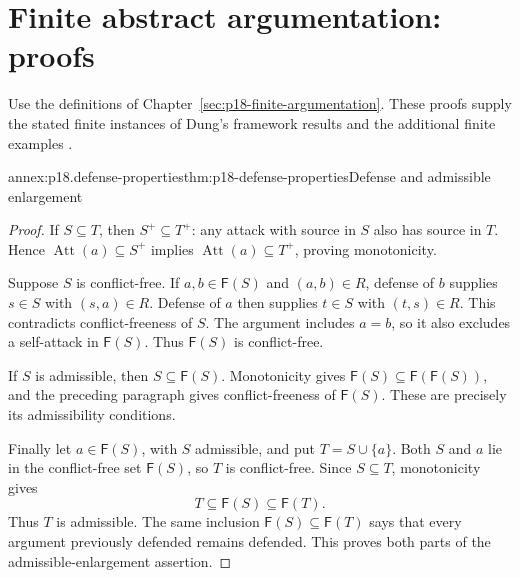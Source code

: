 \section{Finite abstract argumentation: proofs}
\label{sec:annex-p18-finite-argumentation}

Use the definitions of Chapter~\ref{sec:p18-finite-argumentation}. These proofs
supply the stated finite instances of Dung's framework results and the
additional finite examples \cite[pp.~326--330]{Dung1995}.

\begin{annexitem}{annex:p18.defense-properties}{thm:p18-defense-properties}{Defense and admissible enlargement}
\begin{proof}
If \(S\subseteq T\), then \(S^+\subseteq T^+\): any attack with
source in \(S\) also has source in \(T\). Hence
\(\operatorname{Att}(a)\subseteq S^+\) implies
\(\operatorname{Att}(a)\subseteq T^+\), proving monotonicity.

Suppose \(S\) is conflict-free. If \(a,b\in\mathsf F(S)\) and
\((a,b)\in R\), defense of \(b\) supplies \(s\in S\) with
\((s,a)\in R\). Defense of \(a\) then supplies \(t\in S\) with
\((t,s)\in R\). This contradicts conflict-freeness of \(S\).
The argument includes \(a=b\), so it also excludes a self-attack in
\(\mathsf F(S)\). Thus \(\mathsf F(S)\) is conflict-free.

If \(S\) is admissible, then \(S\subseteq\mathsf F(S)\).
Monotonicity gives \(\mathsf F(S)\subseteq\mathsf F(\mathsf F(S))\),
and the preceding paragraph gives conflict-freeness of \(\mathsf F(S)\).
These are precisely its admissibility conditions.

Finally let \(a\in\mathsf F(S)\), with \(S\) admissible, and put
\(T=S\cup\{a\}\). Both \(S\) and \(a\) lie in the conflict-free
set \(\mathsf F(S)\), so \(T\) is conflict-free. Since
\(S\subseteq T\), monotonicity gives
\[
 T\subseteq\mathsf F(S)\subseteq\mathsf F(T).
\]
Thus \(T\) is admissible. The same inclusion
\(\mathsf F(S)\subseteq\mathsf F(T)\) says that every argument
previously defended remains defended. This proves both parts of the
admissible-enlargement assertion.
\end{proof}
\end{annexitem}

